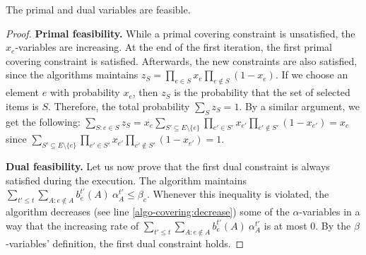 \begin{lemma} \label{lem:prim-dual-feasible}
The primal and dual variables are feasible.
\end{lemma}
%
\begin{proof}

\textbf{Primal feasibility.}
While a primal covering constraint is unsatisfied, the $x_e$-variables are increasing. At the end of the first iteration, the first primal covering constraint is satisfied. Afterwards, the new constraints are
also satisfied, since the algorithms maintains $z_{S} = \prod_{e \in S} x_{e} \prod_{e \notin S} (1 - x_{e})$.
If we choose an element $e$ with probability $x_{e}$, then $z_{S}$ is the probability
that the set of selected items is $S$. Therefore, the total probability $\sum_{S} z_{S} = 1$. By a similar argument, we get the following:
$
	\sum_{S: e \in S} z_{S} = x_{e} \sum_{S' \subseteq E \setminus \{e\}} \prod_{e' \in S'} x_{e'} \prod_{e' \notin S'} (1 - x_{e'}) = x_{e}
$
since
$
	\sum_{S' \subseteq E \setminus \{e\}} \prod_{e' \in S'} x_{e'} \prod_{e' \notin S'} (1 - x_{e'}) = 1
$.

\textbf{Dual feasibility.} Let us now prove that the first dual constraint is always satisfied during the execution. The algorithm maintains $\sum_{t' \le t} \sum_{A: e \notin A} b^{t'}_{e}(A)\ \alpha^{t'}_{A} \leq \beta_{e}$. %
Whenever this inequality is violated, the algorithm decreases (see line \ref{algo-covering:decrease}) some of the $\alpha$-variables in a way that the increasing rate of $\sum_{t' \le t} \sum_{A: e \notin A} b^{t'}_{e}(A)\ \alpha^{t'}_{A}$ is at most 0. By the $\beta$-variables' definition, the first dual constraint holds.


\end{proof}

